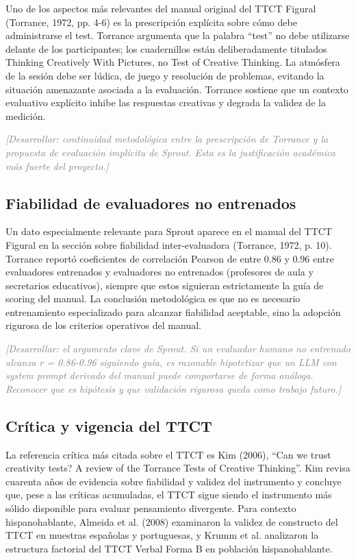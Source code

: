\documentclass[12pt,twoside,titlepage]{report}
\begin{document}
Uno de los aspectos más relevantes del manual original del TTCT Figural (Torrance, 1972, pp. 4-6) es la prescripción explícita sobre cómo debe administrarse el test. Torrance argumenta que la palabra ``test'' no debe utilizarse delante de los participantes; los cuadernillos están deliberadamente titulados Thinking Creatively With Pictures, no Test of Creative Thinking. La atmósfera de la sesión debe ser lúdica, de juego y resolución de problemas, evitando la situación amenazante asociada a la evaluación. Torrance sostiene que un contexto evaluativo explícito inhibe las respuestas creativas y degrada la validez de la medición.

\textcolor{gray}{\textit{[Desarrollar: continuidad metodológica entre la prescripción de Torrance y la propuesta de evaluación implícita de Sprout. Esta es la justificación académica más fuerte del proyecto.]}}

\subsection{Fiabilidad de evaluadores no entrenados}

Un dato especialmente relevante para Sprout aparece en el manual del TTCT Figural en la sección sobre fiabilidad inter-evaluadora (Torrance, 1972, p. 10). Torrance reportó coeficientes de correlación Pearson de entre 0.86 y 0.96 entre evaluadores entrenados y evaluadores no entrenados (profesores de aula y secretarios educativos), siempre que estos siguieran estrictamente la guía de scoring del manual. La conclusión metodológica es que no es necesario entrenamiento especializado para alcanzar fiabilidad aceptable, sino la adopción rigurosa de los criterios operativos del manual.

\textcolor{gray}{\textit{[Desarrollar: el argumento clave de Sprout. Si un evaluador humano no entrenado alcanza r = 0.86-0.96 siguiendo guía, es razonable hipotetizar que un LLM con system prompt derivado del manual puede comportarse de forma análoga. Reconocer que es hipótesis y que validación rigurosa queda como trabajo futuro.]}}

\subsection{Crítica y vigencia del TTCT}

La referencia crítica más citada sobre el TTCT es Kim (2006), ``Can we trust creativity tests? A review of the Torrance Tests of Creative Thinking''. Kim revisa cuarenta años de evidencia sobre fiabilidad y validez del instrumento y concluye que, pese a las críticas acumuladas, el TTCT sigue siendo el instrumento más sólido disponible para evaluar pensamiento divergente. Para contexto hispanohablante, Almeida et al. (2008) examinaron la validez de constructo del TTCT en muestras españolas y portuguesas, y Krumm et al. analizaron la estructura factorial del TTCT Verbal Forma B en población hispanohablante.
\end{document}
